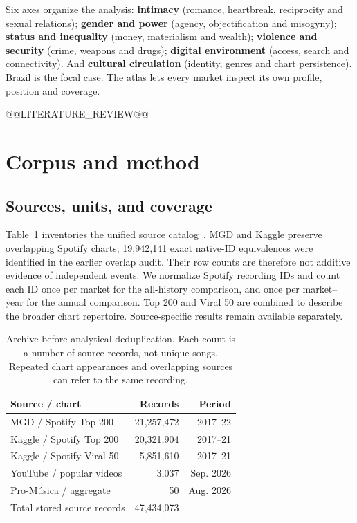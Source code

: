 \documentclass[10pt,a4paper,twocolumn]{article}
\begin{document}
Six axes organize the analysis: \textbf{intimacy} (romance, heartbreak, reciprocity and sexual relations); \textbf{gender and power} (agency, objectification and misogyny); \textbf{status and inequality} (money, materialism and wealth); \textbf{violence and security} (crime, weapons and drugs); \textbf{digital environment} (access, search and connectivity). And \textbf{cultural circulation} (identity, genres and chart persistence). Brazil is the focal case. The atlas lets every market inspect its own profile, position and coverage.

@@LITERATURE_REVIEW@@

\section{Corpus and method}
\subsection{Sources, units, and coverage}
Table~\ref{tab:sources} inventories the unified source catalog~\cite{archive}. MGD and Kaggle preserve overlapping Spotify charts; 19,942,141 exact native-ID equivalences were identified in the earlier overlap audit. Their row counts are therefore not additive evidence of independent events. We normalize Spotify recording IDs and count each ID once per market for the all-history comparison, and once per market--year for the annual comparison. Top 200 and Viral 50 are combined to describe the broader chart repertoire. Source-specific results remain available separately.

\begin{table}[t]
\caption{Archive before analytical deduplication. Each count is a number of source records, not unique songs. Repeated chart appearances and overlapping sources can refer to the same recording.}
\label{tab:sources}
\centering\footnotesize\setlength{\tabcolsep}{3pt}
\begin{tabularx}{\columnwidth}{@{}Xrr@{}}
\toprule Source / chart & Records & Period \\
\midrule
MGD / Spotify Top 200 & 21,257,472 & 2017--22 \\
Kaggle / Spotify Top 200 & 20,321,904 & 2017--21 \\
Kaggle / Spotify Viral 50 & 5,851,610 & 2017--21 \\
YouTube / popular videos & 3,037 & Sep. 2026 \\
Pro-M\'usica / aggregate & 50 & Aug. 2026 \\
\midrule Total stored source records & 47,434,073 & \\
\bottomrule
\end{tabularx}
\end{table}
\end{document}
